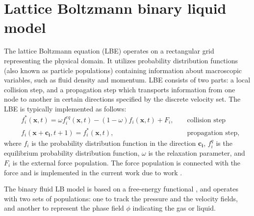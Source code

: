 \documentclass[preprint,12pt]{elsarticle}
\begin{document}
\section{Lattice Boltzmann binary liquid model}
The lattice Boltzmann equation (LBE) operates on a rectangular grid representing the
physical domain. It utilizes
probability distribution functions (also known as particle populations)
containing information about
macroscopic variables, such as fluid density and momentum. LBE consists of
two parts: a local collision step, and a propagation step which transports
information from one node to another in certain
directions specified by the discrete velocity set.
The LBE is typically implemented as follows:
\begin{equation}
\label{standard:implementation}
\begin{aligned}
&f_i^{*}(\bm{x},t)=\omega f_i^{eq}(\bm{x},t)-(1-\omega) f_i(\bm{x},t) +
F_i,&&\text{ collision step}\\
&f_i(\bm{x}+\bm{c_i},t+1)=f_i^{*}(\bm{x},t),&&\text{ propagation step}, 
\end{aligned}
\end{equation}
where $f_i$ is the probability distribution function in the direction $\bm{c_i}$,
{\color{red} $f_i^{q}$ is the equilibrium probability distribution function}, $\omega$ is the
relaxation parameter, and $F_i$ is the external force population.{\color{red} The force population
is connected with the force and is implemented in the current work due to work \cite{guo}.} 

The binary fluid LB model is
based on a free-energy functional \cite{swift,landau}, and operates with two
sets of populations: one to track the pressure and the velocity fields, and another to represent the
phase field $\phi$ indicating the gas or liquid.
\end{document}

